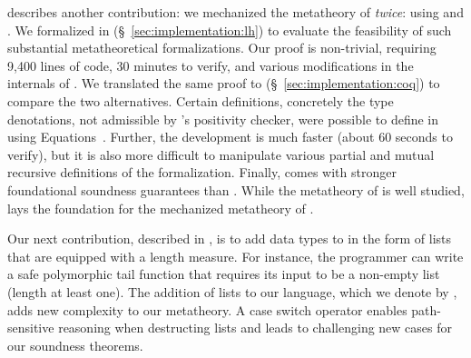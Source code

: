 %
 describes another contribution:
we mechanized the metatheory
of \sysrf \emph{twice}: using \lh and \coq.
%
We formalized \sysrf in \lh (\S~\ref{sec:implementation:lh}) %
to evaluate the feasibility of such
substantial metatheoretical formalizations.
%
Our proof is non-trivial, requiring 9,400 lines
of code, 30 minutes to verify, and various modifications
in the  internals of \lh.
%
We translated the same proof 
to \coq (\S~\ref{sec:implementation:coq})             %
to compare the two alternatives.
%
Certain definitions, concretely the type denotations,
not admissible by \lh's positivity checker,
were possible to define in \coq using Equations~\cite{10.1145/3341690}.
%
Further, the \coq development is
much faster (about 60 seconds to verify),
but it is also more difficult to manipulate various
partial and mutual recursive definitions of the formalization.
%
Finally, \coq comes with stronger foundational
soundness guarantees than \lh.
%
While the metatheory of \coq is well studied,
\sysrf lays the foundation for the mechanized metatheory of \lh.

%

%
Our next contribution,
described in ,
is to add data types to \sysrf in the form of
lists that are equipped with a length measure.
%
For instance, the programmer can write a safe polymorphic 
tail function that requires its input to be a non-empty
list (length at least one).
%
The addition of lists to our language, which we denote
by \sysrfd,
adds new complexity to our metatheory.
%
A case switch operator enables path-sensitive reasoning when
destructing lists and leads to challenging new cases for our
soundness theorems.

\begin{comment}
\mypara{6. Bidirectional Typing Algorithm} %
%
Our final contribution,
presented in \Cref{ch:bidirectional},
is to present a bidirectional typing algorithm, which emits
\emph{verification conditions (VCs)}. If we restrict the syntax
of our refinement predicates to a decidable logic, then these VCs 
can be checked or rejected by an SMT solver. Thus, like \lh,
\sysrfd can be decidably typechecked without placing severe 
restrictions on the user. 
\end{comment}